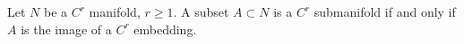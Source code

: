 Let $N$ be a $C^r$ manifold, $r \geqslant 1$. A subset $A \subset N$ is a $C^r$ submanifold if and only if $A$ is the image of a $C^r$ embedding.
